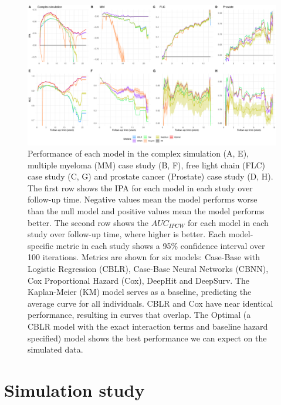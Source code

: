 \documentclass[APA,LATO1COL]{WileyNJD-v2}
\begin{document}



\begin{figure}

{\centering \includegraphics[width=1\linewidth]{../figures/Figure2.pdf} 

}

\caption{Performance of each model in the complex simulation (A, E), multiple myeloma (MM) case study (B, F), free light chain (FLC) case study (C, G)
and prostate cancer (Prostate) case study (D, H). The first row shows the IPA for each model in each study over follow-up time. Negative values mean
the model performs worse than the null model and positive values mean the model performs better. The second row shows the $AUC_{IPCW}$ for
each model in each study over follow-up time, where higher is better. Each model-specific metric in each study shows a 95\% confidence interval over 100 iterations. Metrics
are shown for six models: Case-Base with Logistic Regression (CBLR), Case-Base Neural Networks (CBNN), Cox Proportional Hazard (Cox), DeepHit
and DeepSurv. The Kaplan-Meier (KM) model serves as a baseline, predicting the average curve for all individuals. CBLR and Cox have near identical
performance, resulting in curves that overlap. The Optimal (a CBLR model with the exact interaction terms and baseline hazard specified) model shows
the best performance we can expect on the simulated data.}\label{fig:megaPlot}
\end{figure}



\hypertarget{sims}{%
\section{Simulation study}\label{sims}}
\end{document}
